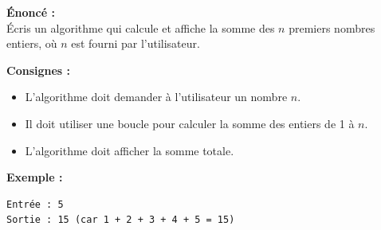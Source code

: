 \documentclass{article}
\begin{document}
\begin{tcolorbox}[colback=green!10!white, colframe=yellow!75!black, title=\textcolor{white}{Exercices}]
\textbf{Énoncé :} \\
Écris un algorithme qui calcule et affiche la somme des \( n \) premiers nombres entiers, où \( n \) est fourni par l'utilisateur.

\textbf{Consignes :}
\begin{itemize}
    \item L'algorithme doit demander à l'utilisateur un nombre \( n \).
    \item Il doit utiliser une boucle pour calculer la somme des entiers de 1 à \( n \).
    \item L'algorithme doit afficher la somme totale.
\end{itemize}

\textbf{Exemple :}
\begin{verbatim}
Entrée : 5
Sortie : 15 (car 1 + 2 + 3 + 4 + 5 = 15)
\end{verbatim}

\end{tcolorbox}
\end{document}
